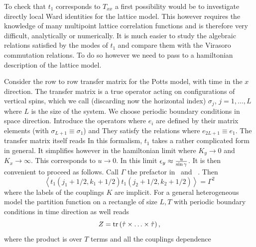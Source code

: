 To check that $t_1$ corresponds to $T_{xx}$ a first possibility would
 be to investigate
directly local Ward identities for the lattice model. This however requires
the knowledge of many multipoint lattice correlation functions and is therefore
very difficult, analytically or numerically. It is much easier to study the
algebraic relations satisfied by the modes of $t_1$ and compare them with
the Virasoro commutation relations. To do so however we need to pass to a
hamiltonian
description of the lattice model.


Consider the row to row transfer matrix for the Potts model, with time
in the $x$ direction. The transfer matrix is
a true operator acting on configurations of vertical  spins, which we call
 (discarding now the horizontal index) $\sigma_j$, $j=1,\ldots,L$ where $L$
is the size of the system. We choose periodic boundary conditions in space
direction.
 Introduce the operators
%
\eqn{}
%
where $e_i$ are defined by their matrix elements
%
\eqn{}
%
(with $\sigma_{L+1}\equiv\sigma_1$) and
%
\eqn{}
%
They satisfy the relations
%
\eqn{}
%
where $e_{2L+1}\equiv e_1$. The transfer matrix itself reads
%
\eqn{}
%
In this formalism, $t_1$ takes a rather complicated form in general.
It simplifies however in the hamiltonian limit where   $K_y\rightarrow 0$
and $K_x\rightarrow \infty$. This corresponds to $u\rightarrow 0$. In this
limit $\epsilon_y\approx{u\over\sin\gamma}$.  It is then convenient to proceed
as
follows. Call $\Gamma$ the prefactor in \tttt\ and \eqi\ . Then
$$
\left<t_1(j_1+1/2,k_1+1/2)t_1(j_2+1/2,k_2+1/2)\right>=\Gamma^2
$$
%
\eqn{}
%
where the labels of the couplings $K$ are implicit. For a general heterogeneous
model the partition function on a rectangle of size $L,T$ with periodic
boundary conditions in time direction as well reads
$$
Z=\hbox{tr}\left(\hat{\tau}\times\ldots\times\hat{\tau}\right),
$$
where the product is over $T$ terms and all the couplings dependence
